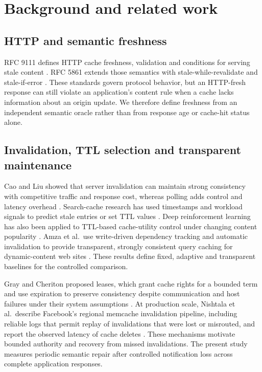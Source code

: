 \documentclass[pdflatex,sn-mathphys-num]{sn-jnl}
\begin{document}
\section{Background and related work}\label{background-and-related-work}

\subsection{HTTP and semantic freshness}\label{http-and-semantic-freshness}

RFC 9111 defines HTTP cache freshness, validation and conditions for serving stale content \citep{rfc9111}. RFC 5861 extends those semantics with stale-while-revalidate and stale-if-error \citep{rfc5861}. These standards govern protocol behavior, but an HTTP-fresh response can still violate an application's content rule when a cache lacks information about an origin update. We therefore define freshness from an independent semantic oracle rather than from response age or cache-hit status alone.

\subsection{Invalidation, TTL selection and transparent maintenance}\label{invalidation-ttl-selection-and-transparent-maintenance}

Cao and Liu showed that server invalidation can maintain strong consistency with competitive traffic and response cost, whereas polling adds control and latency overhead \citep{cao1998strongcache}. Search-cache research has used timestamps and workload signals to predict stale entries or set TTL values \citep{alici2011timestamp, sazoglu2013ttl}. Deep reinforcement learning has also been applied to TTL-based cache-utility control under changing content popularity \citep{cho2021ttlrl}. Amza et al.~use write-driven dependency tracking and automatic invalidation to provide transparent, strongly consistent query caching for dynamic-content web sites \citep{amza2005transparent}. These results define fixed, adaptive and transparent baselines for the controlled comparison.

Gray and Cheriton proposed leases, which grant cache rights for a bounded term and use expiration to preserve consistency despite communication and host failures under their system assumptions \citep{gray1989leases}. At production scale, Nishtala et al.~describe Facebook's regional memcache invalidation pipeline, including reliable logs that permit replay of invalidations that were lost or misrouted, and report the observed latency of cache deletes \citep{nishtala2013memcache}. These mechanisms motivate bounded authority and recovery from missed invalidations. The present study measures periodic semantic repair after controlled notification loss across complete application responses.
\end{document}
